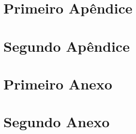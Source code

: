 \documentclass[
	12pt,				    %
	openright,			    %
	oneside,			    %
	a4paper,			    %
    sumario=tradicional,        %
	english,			    %
	brazil,				    %
 ]{abntex2}
\begin{document}
%
\begin{apendicesenv} \thispagestyle{empty}
%
\partapendices
%
\chapter{Primeiro Apêndice} \thispagestyle{empty}
%
\chapter{Segundo Apêndice} \thispagestyle{empty}
%
\end{apendicesenv}
%
%
\begin{anexosenv}
%
\partanexos
%
\chapter{Primeiro Anexo} \thispagestyle{empty}
%
\chapter{Segundo Anexo} \thispagestyle{empty}
%
\end{anexosenv}
\end{document}
